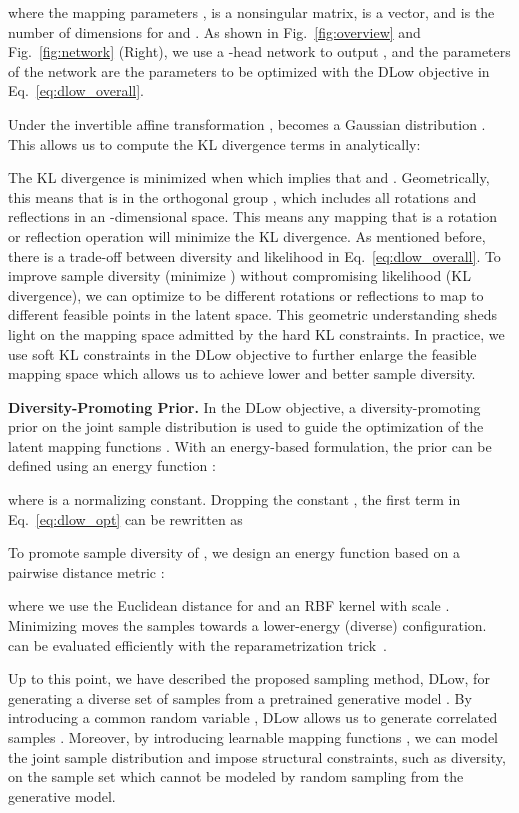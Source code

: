 \documentclass[runningheads]{llncs}
\begin{document}
	where the mapping parameters ,  is a nonsingular matrix,  is a vector, and  is the number of dimensions for  and . As shown in Fig.~\ref{fig:overview} and Fig.~\ref{fig:network} (Right), we use a -head network  to output , and the parameters  of the network  are the parameters to be optimized with the DLow objective in Eq.~\eqref{eq:dlow_overall}.
	
	Under the invertible affine transformation ,  becomes a Gaussian distribution . This allows us to compute the KL divergence terms in  analytically:
	
	The KL divergence is minimized when  which implies that  and . Geometrically, this means that  is in the orthogonal group , which includes all rotations and reflections in an -dimensional space. This means any mapping  that is a rotation or reflection operation will minimize the KL divergence. As mentioned before, there is a trade-off between diversity and likelihood in Eq.~\eqref{eq:dlow_overall}. To improve sample diversity (minimize ) without compromising likelihood (KL divergence), we can optimize  to be different rotations or reflections to map  to different feasible points  in the latent space. This geometric understanding sheds light on the mapping space admitted by the hard KL constraints. In practice, we use soft KL constraints in the DLow objective to further enlarge the feasible mapping space which allows us to achieve lower  and better sample diversity.
	
	
	\vspace{2mm}
	\noindent\textbf{Diversity-Promoting Prior.} In the DLow objective, a diversity-promoting prior  on the joint sample distribution is used to guide the optimization of the latent mapping functions .  
	With an energy-based formulation, the prior  can be defined using an energy function :
	
	where  is a normalizing constant.  Dropping the constant , the first term in Eq.~\eqref{eq:dlow_opt} can be rewritten as
	
	To promote sample diversity of , we design an energy function  based on a pairwise distance metric :
	
	where we use the Euclidean distance for  and an RBF kernel with scale . Minimizing  moves the samples towards a lower-energy (diverse) configuration.
	 can be evaluated efficiently with the reparametrization trick~\cite{kingma2013auto}.
	
	
	Up to this point, we have described the proposed sampling method, DLow, for generating a diverse set of samples from a pretrained generative model . By introducing a common random variable , DLow allows us to generate correlated samples . Moreover, by introducing learnable mapping functions , we can model the joint sample distribution  and impose structural constraints, such as diversity, on the sample set  which cannot be modeled by random sampling from the generative model. 
	
\end{document}
